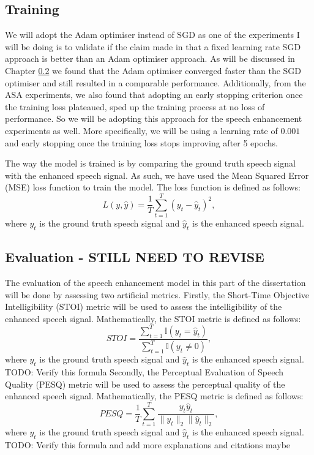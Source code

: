 \documentclass[logo,bsc,singlespacing,parskip,online]{infthesis}
\begin{document}
\subsection{Training}
We will adopt the Adam optimiser instead of SGD as one of the experiments I will be doing 
is to validate if the claim made in \citet{Huwel2020HearDS} that a fixed learning rate SGD approach
is better than an Adam optimiser approach. As will be discussed in Chapter \ref{} 
we found that the Adam optimiser converged faster than the SGD optimiser and still resulted in a comparable 
performance. Additionally, from the ASA experiments, we also found that adopting an early stopping criterion 
once the training loss plateaued, sped up the training process at no loss of performance. So we will be adopting 
this approach for the speech enhancement experiments as well. More specifically, we will be using a learning rate of $0.001$
and early stopping once the training loss stops improving after 5 epochs.

The way the model is trained is by comparing the ground truth speech signal with the enhanced speech signal. 
As such, we have used the Mean Squared Error (MSE) loss function to train the model. The loss function is defined as follows:
\[
L(y, \hat{y}) = \frac{1}{T} \sum_{t=1}^{T} (y_t - \hat{y}_t)^2,
\]
where \(y_t\) is the ground truth speech signal and \(\hat{y}_t\) is the enhanced speech signal.

\subsection{Evaluation - STILL NEED TO REVISE}
The evaluation of the speech enhancement model in this part of the dissertation will be 
done by assessing two artificial metrics.
Firstly, the Short-Time Objective Intelligibility (STOI) metric will be used to assess the intelligibility of the enhanced speech signal.
Mathematically, the STOI metric is defined as follows:
\[
STOI = \frac{\sum_{t=1}^{T} \mathbb{I}(y_t = \hat{y}_t)}{\sum_{t=1}^{T} \mathbb{I}(y_t \neq 0)},
\]
where \(y_t\) is the ground truth speech signal and \(\hat{y}_t\) is the enhanced speech signal.
TODO: Verify this formula
Secondly, the Perceptual Evaluation of Speech Quality (PESQ) metric will be used to assess the perceptual quality of the enhanced speech signal.
Mathematically, the PESQ metric is defined as follows:
\[
PESQ = \frac{1}{T} \sum_{t=1}^{T} \frac{y_t \hat{y}_t}{\|y_t\|_2 \|\hat{y}_t\|_2},
\]
where \(y_t\) is the ground truth speech signal and \(\hat{y}_t\) is the enhanced speech signal.
TODO: Verify this formula and add more explanations and citations maybe
\end{document}
